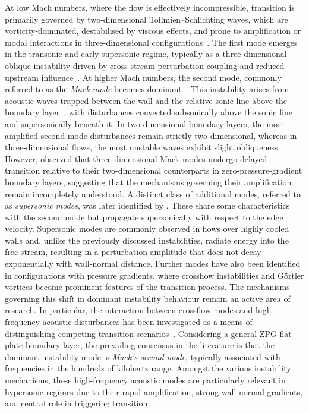 At low Mach numbers, where the flow is effectively incompressible, transition is primarily governed by two-dimensional Tollmien--Schlichting waves, which are vorticity-dominated, destabilised by viscous effects, and prone to amplification or modal interactions in three-dimensional configurations~\citep{Schubauer1948}. The first mode emerges in the transonic and early supersonic regime, typically as a three-dimensional oblique instability driven by cross-stream perturbation coupling and reduced upstream influence~\citep{Mack1984,Reed1996}. At higher Mach numbers, the second mode, commonly referred to as the \textit{Mack mode} becomes dominant~\citep{Kuehl2018}. This instability arises from acoustic waves trapped between the wall and the relative sonic line above the boundary layer~\citep{Bitter2015}, with disturbances convected subsonically above the sonic line and supersonically beneath it. In two-dimensional boundary layers, the most amplified second-mode disturbances remain strictly two-dimensional, whereas in three-dimensional flows, the most unstable waves exhibit slight obliqueness~\citep{Balakumar1991}. However, \citet{Franko2013} observed that three-dimensional Mack modes undergo delayed transition relative to their two-dimensional counterparts in zero-pressure-gradient boundary layers, suggesting that the mechanisms governing their amplification remain incompletely understood. A distinct class of additional modes, referred to as \textit{supersonic modes}, was later identified by \citet{Mack1987}. These share some characteristics with the second mode but propagate supersonically with respect to the edge velocity. Supersonic modes are commonly observed in flows over highly cooled walls and, unlike the previously discussed instabilities, radiate energy into the free stream, resulting in a perturbation amplitude that does not decay exponentially with wall-normal distance. Further modes have also been identified in configurations with pressure gradients, where crossflow instabilities and Görtler vortices become prominent features of the transition process. The mechanisms governing this shift in dominant instability behaviour remain an active area of research. In particular, the interaction between crossflow modes and high-frequency acoustic disturbances has been investigated as a means of distinguishing competing transition scenarios~\citep{Dong2020}. Considering a general \gls{ZPG} flat-plate boundary layer, the prevailing consensus in the literature is that the dominant instability mode is \textit{Mack's second mode}, typically associated with frequencies in the hundreds of kilohertz range. Amongst the various instability mechanisms, these high-frequency acoustic modes are particularly relevant in hypersonic regimes due to their rapid amplification, strong wall-normal gradients, and central role in triggering transition.


